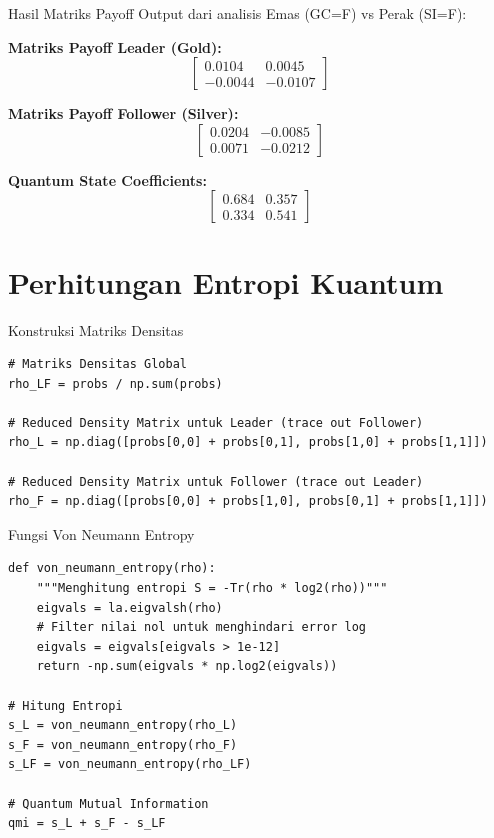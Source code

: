 \documentclass[aspectratio=169]{beamer}
\begin{document}
\begin{frame}{Hasil Matriks Payoff}
    Output dari analisis Emas (GC=F) vs Perak (SI=F):
    
    \vspace{0.3cm}
    
    \textbf{Matriks Payoff Leader (Gold):}
    \begin{equation*}
        \begin{bmatrix} 0.0104 & 0.0045 \\ -0.0044 & -0.0107 \end{bmatrix}
    \end{equation*}
    
    \textbf{Matriks Payoff Follower (Silver):}
    \begin{equation*}
        \begin{bmatrix} 0.0204 & -0.0085 \\ 0.0071 & -0.0212 \end{bmatrix}
    \end{equation*}
    
    \textbf{Quantum State Coefficients:}
    \begin{equation*}
        \begin{bmatrix} 0.684 & 0.357 \\ 0.334 & 0.541 \end{bmatrix}
    \end{equation*}
\end{frame}

\section{Perhitungan Entropi Kuantum}

\begin{frame}[fragile]{Konstruksi Matriks Densitas}
\begin{lstlisting}
# Matriks Densitas Global
rho_LF = probs / np.sum(probs) 

# Reduced Density Matrix untuk Leader (trace out Follower)
rho_L = np.diag([probs[0,0] + probs[0,1], probs[1,0] + probs[1,1]])

# Reduced Density Matrix untuk Follower (trace out Leader)
rho_F = np.diag([probs[0,0] + probs[1,0], probs[0,1] + probs[1,1]])
\end{lstlisting}
\end{frame}

\begin{frame}[fragile]{Fungsi Von Neumann Entropy}
\begin{lstlisting}
def von_neumann_entropy(rho):
    """Menghitung entropi S = -Tr(rho * log2(rho))"""
    eigvals = la.eigvalsh(rho)
    # Filter nilai nol untuk menghindari error log
    eigvals = eigvals[eigvals > 1e-12]
    return -np.sum(eigvals * np.log2(eigvals))

# Hitung Entropi
s_L = von_neumann_entropy(rho_L)
s_F = von_neumann_entropy(rho_F)
s_LF = von_neumann_entropy(rho_LF)

# Quantum Mutual Information
qmi = s_L + s_F - s_LF
\end{lstlisting}
\end{frame}
\end{document}
